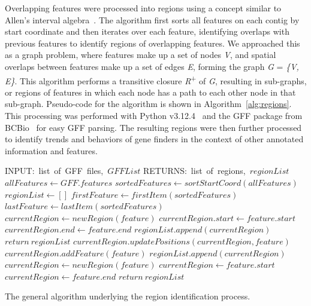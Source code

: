 Overlapping features were processed into regions using a concept
similar to Allen's interval algebra~\cite{dechter2003}. The
algorithm first sorts all features on each contig by start coordinate
and then iterates over each feature, identifying overlaps with
previous features to identify regions of overlapping features. We
approached this as a graph problem, where features make up a set of
nodes \textit{V}, and spatial overlaps between features make up a set
of edges \textit{E}, forming the graph \textit{G} = \textit{\{V,
    E\}}. This algorithm performs a transitive closure
\textit{R}\textsuperscript{+} of \textit{G}, resulting in sub-graphs,
or regions of features in which each node has a path to each other
node in that sub-graph. Pseudo-code for the algorithm is shown in
Algorithm~\ref{alg:regions}. This processing was performed with Python
v3.12.4~\cite{foundationa} and the GFF package from BCBio~\cite{chapmana}
for easy GFF parsing. The resulting regions were then further
processed to identify trends and behaviors of gene finders in the
context of other annotated information and features.

\begin{algorithm}
  \begin{algorithmic}
    \State INPUT:\ list\ of\ GFF\ files,\ $GFFList$
    \State RETURNS:\ list\ of\ regions,\ $regionList$
    \State $allFeatures \gets GFF.features$
    \EndFor
    \State $sortedFeatures \gets sortStartCoord(allFeatures)$
    \State $regionList \gets []$
    \State $firstFeature \gets firstItem(sortedFeatures)$
    \State $lastFeature \gets lastItem(sortedFeatures)$
        \State $currentRegion \gets newRegion(feature)$
        \State $currentRegion.start \gets feature.start$
        \State $currentRegion.end \gets feature.end$
        \State $regionList.append(currentRegion)$
        \State $return\ regionList$
        \State $currentRegion.updatePositions(currentRegion, feature)$
        \State $currentRegion.addFeature(feature)$
      \Else
        \State $regionList.append(currentRegion)$
        \State $currentRegion \gets newRegion(feature)$
        \State $currentRegion \gets feature.start$
        \State $currentRegion \gets feature.end$
      \EndIf
    \EndFor
    \State $return\ regionList$
  \end{algorithmic}
  \caption{The general algorithm underlying the region identification
    process.}\label{alg:regions}
\end{algorithm}

